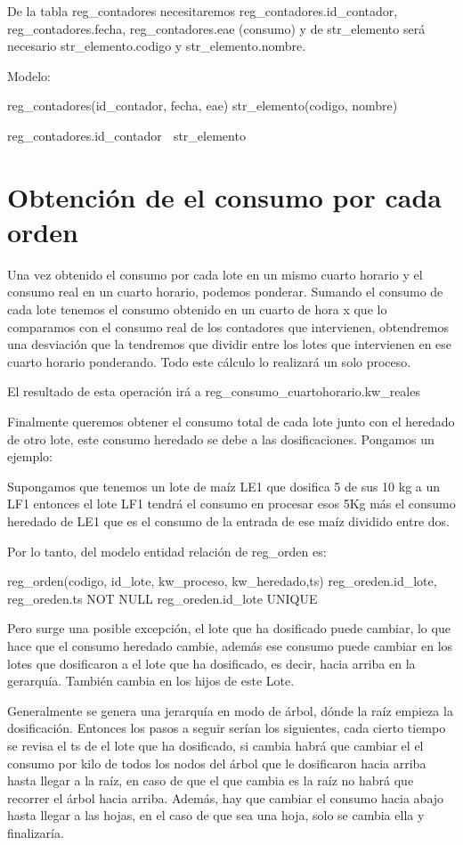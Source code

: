De la tabla reg_contadores necesitaremos reg_contadores.id_contador, reg_contadores.fecha,
 reg_contadores.eae (consumo) y de str_elemento será necesario str_elemento.codigo y 
str_elemento.nombre.

Modelo:

reg_contadores(id_contador, fecha, eae)
str_elemento(codigo, nombre)

reg_contadores.id_contador  str_elemento

\section*{Obtención de el consumo por cada orden}

Una vez obtenido el consumo por cada lote en un mismo cuarto horario y el consumo real en un cuarto 
horario, podemos ponderar. Sumando el consumo de cada lote tenemos el consumo obtenido en un 
cuarto de hora x que lo comparamos con el consumo real de los contadores que intervienen,
 obtendremos una desviación que la tendremos que dividir entre los lotes que intervienen en ese 
cuarto horario ponderando. Todo este cálculo lo realizará un solo proceso.

El resultado de esta operación irá a reg_consumo_cuartohorario.kw_reales


Finalmente queremos obtener el consumo total de cada lote junto con el heredado de otro lote, este
 consumo heredado se debe a las dosificaciones. Pongamos un ejemplo:

Supongamos que tenemos un lote de maíz LE1 que dosifica 5 de sus 10 kg a un LF1 entonces el lote LF1 
tendrá el consumo en procesar esos 5Kg más el consumo heredado de LE1 que es el consumo de la entrada
 de ese maíz dividido entre dos.

Por lo tanto, del modelo entidad relación de reg_orden es:

reg_orden(codigo, id_lote, kw_proceso, kw_heredado,ts)
reg_oreden.id_lote, reg_oreden.ts NOT NULL
reg_oreden.id_lote UNIQUE

Pero surge una posible excepción, el lote que ha dosificado puede cambiar, lo que hace que el consumo 
heredado cambie, además ese consumo puede cambiar en los lotes que dosificaron a el lote que ha 
dosificado, es decir, hacia arriba en la gerarquía. También cambia en los hijos de este Lote.

Generalmente se genera una jerarquía en modo de árbol, dónde la raíz empieza la dosificación. Entonces 
los pasos a seguir serían los siguientes, cada cierto tiempo se revisa el ts de el lote que ha dosificado,
 si cambia habrá que cambiar el el consumo por kilo de todos los nodos del árbol que le dosificaron hacia
 arriba hasta llegar a la raíz, en caso de que el que cambia es la raíz no habrá que recorrer el árbol hacia
 arriba. Además, hay que cambiar el consumo hacia abajo hasta llegar a las hojas, en el caso de que sea 
una hoja, solo se cambia ella y finalizaría.

